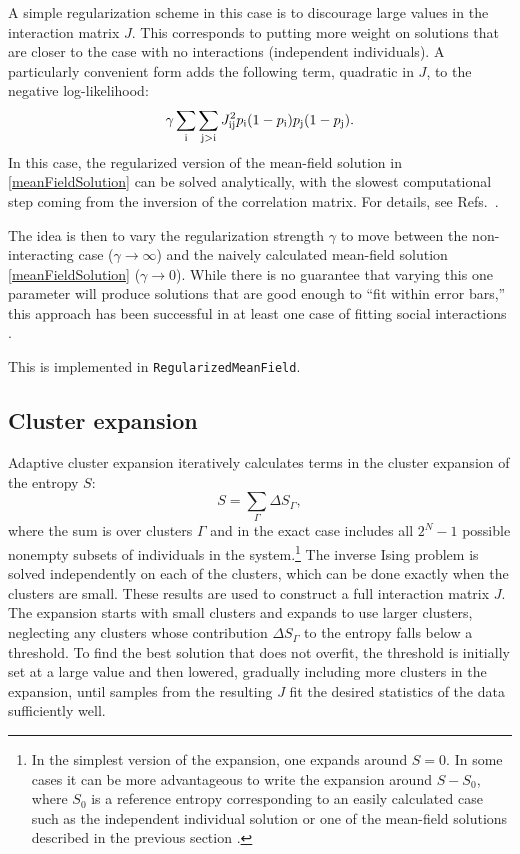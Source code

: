 \documentclass[aps,prl,twocolumn,nofootinbib]{revtex4-1}
\begin{document}
A simple regularization scheme in this case is to discourage large values in the interaction
matrix $J$.  This corresponds to putting more weight on solutions that are closer to
the case with no interactions (independent individuals).  A particularly convenient form
adds the following term, quadratic in $J$, to the negative log-likelihood:
\begin{equation}
\gamma \sum_{\rm i} \sum_{\rm j > i} J_{\rm ij}^2 p_{\rm i} (1-p_{\rm i}) p_{\rm j} (1-p_{\rm j}).
\end{equation}
In this case, the regularized version of the mean-field solution in \eqref{meanFieldSolution}
can be solved analytically, with the slowest computational step coming from the inversion
of the correlation matrix.  For details, see Refs.~\cite{Daniels:1cq,BarCoc13}.

The idea is then to vary the regularization strength $\gamma$ to move between the
non-interacting case ($\gamma \rightarrow \infty$) and the naively calculated
mean-field solution \eqref{meanFieldSolution} ($\gamma \rightarrow 0$).
While there is no guarantee that varying this one parameter will produce solutions that are
good enough to ``fit within error bars,'' this approach has been successful in at least
one case of fitting social interactions \cite{Daniels:1cq}.

This is implemented in {\tt RegularizedMeanField}.



\subsection{Cluster expansion}

Adaptive cluster expansion \cite{Monasson:2011fo,CocMon12,BarCoc13}
iteratively calculates terms in the
cluster expansion of the entropy $S$:
\begin{equation}
S = \sum_\Gamma \Delta S_\Gamma,
\end{equation}
where the sum is over clusters $\Gamma$ and in the exact case
includes all $2^N - 1$ possible nonempty subsets of individuals in the system.\footnote{In the simplest version of the expansion,
one expands around $S=0$.  In some cases it can be more advantageous to write the
expansion around $S-S_0$, where $S_0$ is a reference entropy corresponding to
an easily calculated case such as
the independent individual solution or one of the mean-field solutions
described in the previous section \cite{BarCoc13}.}
The inverse Ising problem is solved independently
on each of the clusters, which can be done exactly when the
clusters are small.  These results are used to construct a full
interaction matrix $J$.
The expansion starts with small clusters and expands to use larger
clusters, neglecting any clusters whose
contribution $\Delta S_\Gamma$ to the entropy falls below a threshold.
To find the best solution that does not overfit,
the threshold is initially set at a large value and then lowered,
gradually including more clusters in the expansion, until samples from
the resulting $J$ fit the desired statistics of the data sufficiently well.
\end{document}
